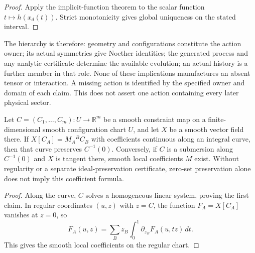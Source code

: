 \documentclass[12pt,a4paper]{article}
\begin{document}
\begin{proof}
Apply the implicit-function theorem to the scalar function
$t\mapsto h(x_d(t))$.  Strict monotonicity gives global uniqueness on the
stated interval.
\end{proof}

The hierarchy is therefore: geometry and configurations constitute
the action owner; its actual symmetries give Noether identities;
the generated process and any analytic certificate determine the
available evolution; an actual history is a further member in that
role.  None of these implications manufactures an absent tensor or
interaction.  A missing action is identified by the specified owner and domain
of each claim.  This does not assert one action containing every later physical sector.

\begin{lemma}
\label{p3a:lem:regular-constraint-ideal}
Let $C=(C_1,\ldots,C_m):U\to\mathbb R^m$ be a smooth constraint map on a
finite-dimensional smooth configuration chart $U$, and let $X$ be a smooth
vector field there.
If $X[C_A]=M_A{}^BC_B$ with coefficients continuous along an integral curve,
then that curve preserves $C^{-1}(0)$. Conversely, if $C$ is a submersion
along $C^{-1}(0)$ and $X$ is tangent there, smooth local coefficients $M$
exist. Without regularity or a separate ideal-preservation certificate,
zero-set preservation alone does not imply this coefficient formula.
\end{lemma}
\begin{proof}
Along the curve, $C$ solves a homogeneous linear system, proving the first
claim. In regular coordinates $(u,z)$ with $z=C$, the function
$F_A=X[C_A]$ vanishes at $z=0$, so
\[
 F_A(u,z)=\sum_Bz_B\int_0^1\partial_{z_B}F_A(u,tz)\,dt.
\]
This gives the smooth local coefficients on the regular chart.
\end{proof}
\end{document}
